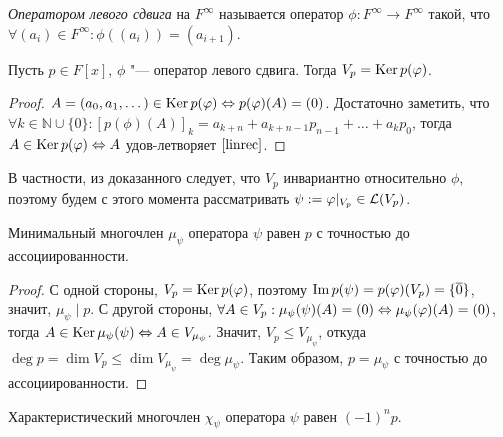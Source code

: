 \begin{definition}
	\textit{Оператором левого сдвига} на $F^\infty$ называется оператор $\phi: F^{\infty} \rightarrow F^{\infty}$ такой, что $\forall (a_i) \in F^{\infty}: \phi((a_i)) = (a_{i + 1})$.
\end{definition}

\begin{proposition}
	Пусть $p \in F[x]$, $\phi$ "--- оператор левого сдвига. Тогда $V_p = \operatorname{Ker}{p(\varphi)}$.
\end{proposition}

\begin{proof}
	$A = (a_0, a_1, \dots) \in \operatorname{Ker}{p(\varphi)} \Leftrightarrow p(\varphi)(A) = (0)$. Достаточно заметить, что $\forall k \in \mathbb{N} \cup \{0\}: [p(\phi)(A)]_k = a_{k+n} + a_{k + n - 1}p_{n - 1} + \dots + a_kp_0$, тогда $A \in \operatorname{Ker}{p(\varphi)} \Leftrightarrow A$ удов-летворяет $\eqref*{linrec}$.
\end{proof}

\begin{note}
	В частности, из доказанного следует, что $V_p$ инвариантно относительно $\phi$, поэтому будем с этого момента рассматривать $\psi := \phi|_{V_p} \hm{\in} \mathcal{L}(V_p)$.
\end{note}

\begin{proposition}
	Минимальный многочлен $\mu_\psi$ оператора $\psi$ равен $p$ с точностью до ассоциированности.
\end{proposition}

\begin{proof}
	С одной стороны, $V_p = \operatorname{Ker}{p(\varphi)}$, поэтому $\operatorname{Im}{p(\psi)} = p(\varphi)(V_p) = \{\overline{0}\}$, значит, $\mu_\psi\mid p$. С другой стороны, $\forall A \in V_p: \mu_\psi(\psi)(A) = (0) \hm{\Leftrightarrow} \mu_\psi(\phi)(A) = (0)$, тогда $A \in \operatorname{Ker}{\mu_\psi(\psi)} \Leftrightarrow A \in V_{\mu_{\psi}}$. Значит, $V_p \le V_{\mu_\psi}$, откуда $\deg{p} = \dim{V_p} \le \dim{V_{\mu_\psi}} = \deg{\mu_\psi}$. Таким образом, $p = \mu_\psi$ с точностью до ассоциированности.
\end{proof}

\begin{proposition}
	Характеристический многочлен $\chi_\psi$ оператора $\psi$ равен $(-1)^np$.
\end{proposition}

